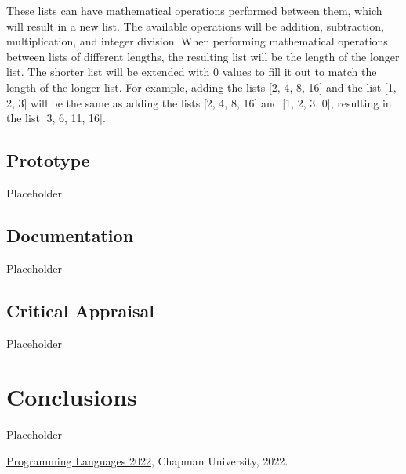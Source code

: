\documentclass{article}
\theoremstyle{theorem}
\theoremstyle{definition}
\theoremstyle{remark}
\begin{document}
\medskip\noindent
These lists can have mathematical operations performed between them, which will result in a new list. The available operations will be addition, subtraction, multiplication, and integer division. When performing mathematical operations between lists of different lengths, the resulting list will be the length of the longer list. The shorter list will be extended with 0 values to fill it out to match the length of the longer list. For example, adding the lists [2, 4, 8, 16] and the list [1, 2, 3] will be the same as adding the lists [2, 4, 8, 16] and [1, 2, 3, 0], resulting in the list [3, 6, 11, 16].

\subsection{Prototype}

Placeholder

\subsection{Documentation}

Placeholder

\subsection{Critical Appraisal}

Placeholder

\section{Conclusions}\label{conclusions}

Placeholder

\begin{thebibliography}{99}
 \href{https://github.com/alexhkurz/programming-languages-2022/blob/main/README.md}{Programming Languages 2022}, Chapman University, 2022.
\end{thebibliography}
\end{document}
